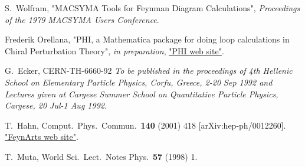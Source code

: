 \begin{thebibliography}{99}
 S.~Wolfram, "MACSYMA Tools for Feynman Diagram Calculations",
{\sl Proceedings of the 1979 MACSYMA Users Conference}.

 Frederik Orellana, "PHI, a Mathematica package for doing loop calculations in Chiral Perturbation Theory", {\it in preparation}, \href{http://www.feyncalc.org/phi/}{"PHI web site"}.

G.~Ecker,
CERN-TH-6660-92
{\it To be published in the proceedings of 4th Hellenic School on Elementary Particle Physics, Corfu, Greece, 2-20 Sep 1992 and Lectures given at
Cargese Summer School on Quantitative Particle Physics, Cargese, 20 Jul-1 Aug 1992}.

T.~Hahn,
Comput.\ Phys.\ Commun.\  {\bf 140} (2001) 418
[arXiv:hep-ph/0012260].
\href{http://www.feynarts.de/}{"FeynArts web site"}.

T.~Muta,
World Sci.\ Lect.\ Notes Phys.\  {\bf 57} (1998) 1.

\end{thebibliography}

